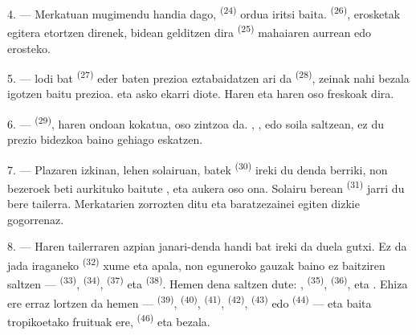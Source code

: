 4. --- Merkatuan mugimendu handia dago, 
\textsuperscript{(24)} ordua iritsi baita. 
\textsuperscript{(26)}, erosketak egitera etortzen direnek, bidean gelditzen dira
 \textsuperscript{(25)} mahaiaren aurrean
 edo  erosteko.

5. ---  lodi bat \textsuperscript{(27)} 
eder baten prezioa eztabaidatzen ari da 
\textsuperscript{(28)}, zeinak nahi bezala igotzen baitu prezioa.
 eta  asko ekarri diote. Haren
 eta haren  oso freskoak dira.

\VUsaut{4.0mm}
\VUsaut{3.0mm}

6. ---  \textsuperscript{(29)}, haren ondoan kokatua,
oso zintzoa da. , ,  edo
 soila saltzean, ez du prezio bidezkoa baino gehiago eskatzen.

7. --- Plazaren izkinan, lehen solairuan,  batek
\textsuperscript{(30)} ireki du denda berriki, non bezeroek beti aurkituko
baitute ,  eta  aukera oso ona. Solairu berean 
\textsuperscript{(31)} jarri du bere tailerra. Merkatarien 
zorrozten ditu eta baratzezainei  egiten dizkie
 gogorrenaz.

\VUsaut{4.0mm}
\VUsaut{3.0mm}

8. --- Haren tailerraren azpian janari-denda handi bat ireki da duela gutxi. Ez da
jada iraganeko  \textsuperscript{(32)} xume eta apala, non
eguneroko gauzak baino ez baitziren saltzen --- 
\textsuperscript{(33)},  \textsuperscript{(34)},
 \textsuperscript{(37)} eta 
\textsuperscript{(38)}. Hemen dena saltzen dute: ,
 \textsuperscript{(35)}, 
\textsuperscript{(36)},  eta
. Ehiza ere erraz lortzen da hemen --- 
\textsuperscript{(39)},  \textsuperscript{(40)},
 \textsuperscript{(41)}, 
\textsuperscript{(42)},  \textsuperscript{(43)} edo
 \textsuperscript{(44)} --- eta baita tropikoetako fruituak ere,
 \textsuperscript{(46)} eta  bezala.

